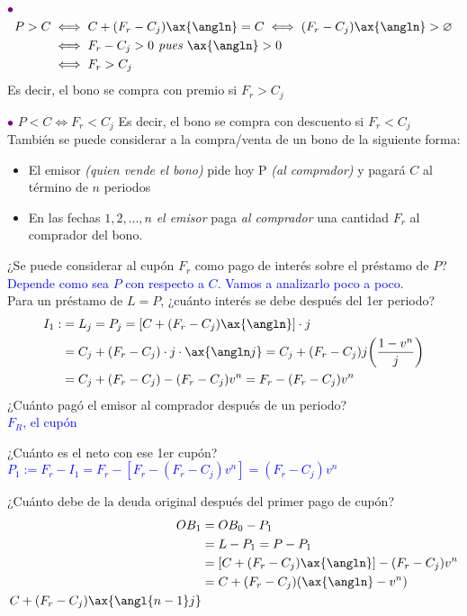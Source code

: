 \textcolor{purple}{$\bullet$}\begin{align*}
    P>C &\iff C+(F_r-C_j)\ax{\angln}=C \iff (F_r -C_j)\ax{\angln}>\varnothing\\
    &\iff F_r-C_j>0 \textit{ pues }\ax{\angln}>0\\
    &\iff F_r> C_j
\end{align*}
Es decir, el bono se compra con premio si $F_r>C_j$

\textcolor{purple}{$\bullet$} $P<C\iff F_r<C_j$
Es decir, el bono se compra con descuento si $F_r<C_j$\\
También se puede considerar a la compra/venta de un bono de la siguiente forma:
\begin{itemize}
    \item El emisor \textit{(quien vende el bono)} pide hoy P \textit{(al comprador)} y pagará $C$ al término de $n$ periodos
    \item En las fechas $1,2,...,n$ \textit{el emisor} paga \textit{al comprador} una cantidad $F_r$ al comprador del bono.
\end{itemize}

¿Se puede considerar al cupón $F_r$ como pago de interés sobre el préstamo de $P$?\\
\textcolor{blue}{Depende como sea $P$ con respecto a $C$. Vamos a analizarlo poco a poco.}\\
Para un préstamo de $L=P$, ¿cuánto interés se debe después del 1er periodo?
\begin{align*}
    I_1 :&=L_j =P_j = [C+(F_r-C_j)\ax{\angln}]\cdot j\\
    &= C_j + (F_r-C_j)\cdot j\cdot\ax{\angln j} = C_j+ (F_r-C_j)j\bigg(\frac{1-v^n}{j}\bigg)\\
    &= C_j + (F_r-C_j)- (F_r-C_j)v^n = F_r - (F_r-C_j)v^n
\end{align*}
¿Cuánto pagó el emisor al comprador después de un periodo?\\
\textcolor{blue}{$F_R$, el cupón}

¿Cuánto es el neto con ese 1er cupón?\\
\textcolor{blue}{$P_1:= F_r -I_1 = F_r-[F_r-(F_r-C_j)v^n] = (F_r-C_j)v^n$}

¿Cuánto debe de la deuda original después del primer pago de cupón?
\begin{align*}
    OB_1 &= OB_0 -P_1\\
    &= L -P_1 = P - P_1\\
    &= [C + (F_r -C_j)\ax{\angln}] - (F_r-C_j)v^n\\
    &= C+ (F_r-C_j)(\ax{\angln} - v^n)\\
    C + (F_r - C_j)\ax{\angl{n-1}j}
\end{align*}

